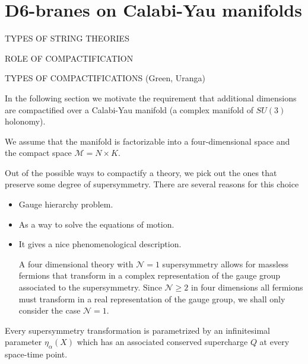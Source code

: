 \chapter{D6-branes on Calabi-Yau manifolds}

TYPES OF STRING THEORIES



ROLE OF COMPACTIFICATION



TYPES OF COMPACTIFICATIONS (Green, Uranga)

In the following section we motivate the requirement that additional dimensions are compactified
over a Calabi-Yau manifold (a complex manifold of $SU(3)$ holonomy).


We assume that the manifold is factorizable into a four-dimensional space and the compact space
$\mathcal M =  N\times K$.



Out of the possible ways to compactify a theory, we pick out the ones that preserve some
degree of supersymmetry.
There are several reasons for this choice
\begin{itemize}
  \item Gauge hierarchy problem.
  \item As a way to solve the equations of motion.
  \item It gives a nice phenomenological description.

    A four dimensional theory with $\mathcal N=1$ supersymmetry allows for massless fermions
    that transform in a complex representation of the gauge group associated to the supersymmetry.
    Since $\mathcal N\geq 2$ in four dimensions all fermions must transform in a real representation 
    of the gauge group, we shall only consider the case $\mathcal N=1$.

\end{itemize}

Every supersymmetry transformation is parametrized by an infinitesimal parameter $\eta_\alpha (X)$
which has an associated conserved supercharge $Q$ at every space-time point.

